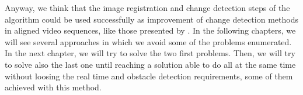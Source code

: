 Anyway, we think that the image registration and change detection steps of the algorithm could be used successfully as improvement of change detection methods in aligned video sequences, like those presented by \cite{diego2011video, evangelidis2011slice, evangelidis2011efficient}. In the following chapters, we will see several approaches in which we avoid some of the problems enumerated. In the next chapter, we will try to solve the two first problems. Then, we will try to solve also the last one until reaching a solution able to do all at the same time without loosing the real time and obstacle detection requirements, some of them achieved with this method.
























